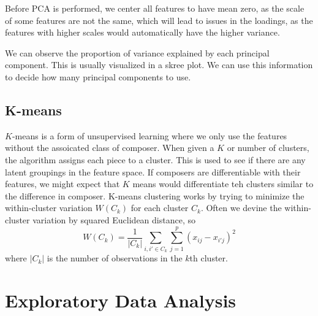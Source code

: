 \documentclass[12pt,twoside]{reedthesis}
\theoremstyle{definition}
\theoremstyle{definition}
\theoremstyle{definition}
\theoremstyle{remark}
\begin{document}
Before PCA is performed, we center all features to have mean zero, as
the scale of some features are not the same, which will lead to issues
in the loadings, as the features with higher scales would automatically
have the higher variance.

We can observe the proportion of variance explained by each principal
component. This is usually visualized in a skree plot. We can use this
information to decide how many principal components to use.

\section{K-means}\label{k-means}

\(K\)-means is a form of unsupervised learning where we only use the
features without the assoicated class of composer. When given a \(K\) or
number of clusters, the algorithm assigns each piece to a cluster. This
is used to see if there are any latent groupings in the feature space.
If composers are differentiable with their features, we might expect
that \(K\) means would differentiate teh clusters similar to the
difference in composer. K-means clustering works by trying to minimize
the within-cluster variation \(W(C_k)\) for each cluster \(C_k\). Often
we devine the within-cluster variation by squared Euclidean distance, so
\[W(C_k) = \frac{1}{|C_k|} \sum_{i,i' \in C_k}\sum_{j = 1}^p (x_{ij} - x_{i'j})^2 \]
where \(|C_k|\) is the number of observations in the \(k\)th cluster.

\chapter{Exploratory Data Analysis}\label{exploratory-data-analysis}
\end{document}

